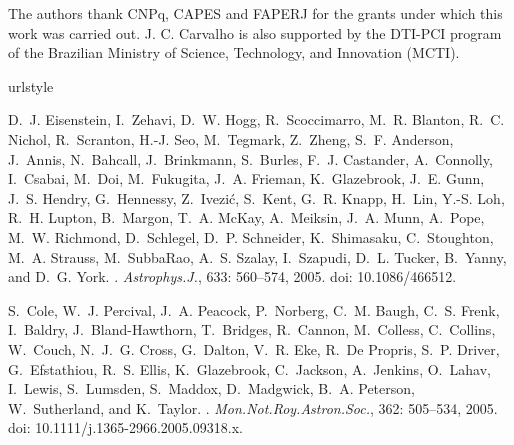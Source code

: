 \documentclass[a4paper,11pt]{article}
\begin{document}
\acknowledgments

The authors thank CNPq, CAPES and FAPERJ for the grants under which this 
work was carried out.  J. C. Carvalho is also supported by the DTI-PCI  program of the Brazilian Ministry of Science, Technology, and Innovation (MCTI). 

\begin{thebibliography}{23}
\providecommand{\natexlab}[1]{#1}
\providecommand{\url}[1]{\texttt{#1}}
\expandafter\ifx\csname urlstyle\endcsname\relax
  \providecommand{\doi}[1]{doi: #1}\else
  \providecommand{\doi}{doi: \begingroup \urlstyle{rm}\Url}\fi

D.~J. {Eisenstein}, I.~{Zehavi}, D.~W. {Hogg}, R.~{Scoccimarro}, M.~R.
  {Blanton}, R.~C. {Nichol}, R.~{Scranton}, H.-J. {Seo}, M.~{Tegmark},
  Z.~{Zheng}, S.~F. {Anderson}, J.~{Annis}, N.~{Bahcall}, J.~{Brinkmann},
  S.~{Burles}, F.~J. {Castander}, A.~{Connolly}, I.~{Csabai}, M.~{Doi},
  M.~{Fukugita}, J.~A. {Frieman}, K.~{Glazebrook}, J.~E. {Gunn}, J.~S.
  {Hendry}, G.~{Hennessy}, Z.~{Ivezi{\'c}}, S.~{Kent}, G.~R. {Knapp}, H.~{Lin},
  Y.-S. {Loh}, R.~H. {Lupton}, B.~{Margon}, T.~A. {McKay}, A.~{Meiksin}, J.~A.
  {Munn}, A.~{Pope}, M.~W. {Richmond}, D.~{Schlegel}, D.~P. {Schneider},
  K.~{Shimasaku}, C.~{Stoughton}, M.~A. {Strauss}, M.~{SubbaRao}, A.~S.
  {Szalay}, I.~{Szapudi}, D.~L. {Tucker}, B.~{Yanny}, and D.~G. {York}.
.
\newblock \emph{Astrophys.J.}, 633: 560--574, 2005.
\newblock \doi{10.1086/466512}.

S.~{Cole}, W.~J. {Percival}, J.~A. {Peacock}, P.~{Norberg}, C.~M. {Baugh},
  C.~S. {Frenk}, I.~{Baldry}, J.~{Bland-Hawthorn}, T.~{Bridges}, R.~{Cannon},
  M.~{Colless}, C.~{Collins}, W.~{Couch}, N.~J.~G. {Cross}, G.~{Dalton}, V.~R.
  {Eke}, R.~{De Propris}, S.~P. {Driver}, G.~{Efstathiou}, R.~S. {Ellis},
  K.~{Glazebrook}, C.~{Jackson}, A.~{Jenkins}, O.~{Lahav}, I.~{Lewis},
  S.~{Lumsden}, S.~{Maddox}, D.~{Madgwick}, B.~A. {Peterson}, W.~{Sutherland},
  and K.~{Taylor}.
.
\newblock \emph{Mon.Not.Roy.Astron.Soc.}, 362: 505--534, 2005.
\newblock \doi{10.1111/j.1365-2966.2005.09318.x}.


\end{thebibliography}
\end{document}

